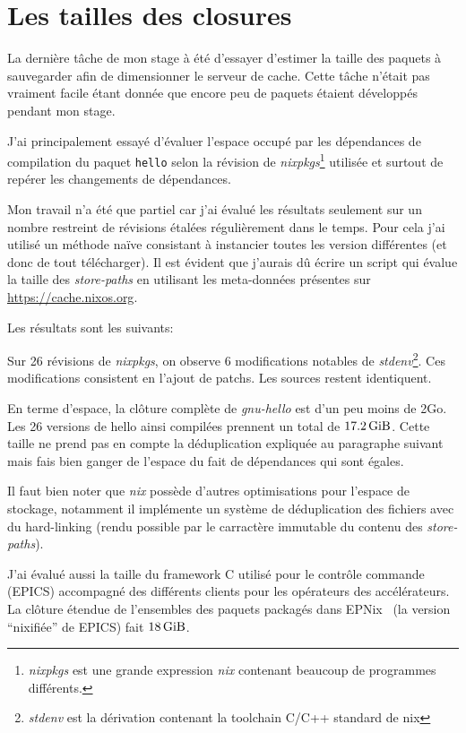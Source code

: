 \documentclass[a4paper,12pt]{article}
\begin{document}
\section{Les tailles des closures}

La dernière tâche de mon stage à été d'essayer d'estimer la taille des paquets à
sauvegarder afin de dimensionner le serveur de cache. Cette tâche n'était pas
vraiment facile étant donnée que encore peu de paquets étaient développés
pendant mon stage.

J'ai principalement essayé d'évaluer l'espace occupé par les dépendances de
compilation du paquet \texttt{hello} selon la révision de
\emph{nixpkgs}\footnote{\emph{nixpkgs} est une grande expression \emph{nix}
contenant beaucoup de programmes différents.} utilisée
et surtout de repérer les changements de dépendances.

Mon travail n'a été que partiel car j'ai évalué les résultats seulement sur un
nombre restreint de révisions étalées régulièrement dans le temps. Pour cela
j'ai utilisé un méthode naïve consistant à instancier toutes les version
différentes (et donc de tout télécharger). Il est évident que j'aurais dû écrire
un script qui évalue la taille des \emph{store-paths} en utilisant les
meta-données présentes sur \url{https://cache.nixos.org}.

Les résultats sont les suivants:


Sur 26 révisions de \emph{nixpkgs}, on observe 6 modifications notables de
\emph{stdenv}\footnote{\emph{stdenv} est la dérivation contenant la toolchain
C/C++ standard de nix}. Ces modifications consistent en l'ajout de patchs. Les
sources restent identiquent.

En terme d'espace, la clôture complète de \emph{gnu-hello} est d'un peu moins de
2Go. Les 26 versions de hello ainsi compilées prennent un total de
$\SI{17.2}{\gibi\byte}$. Cette taille ne prend pas en compte la déduplication
expliquée au paragraphe suivant mais fais bien ganger de l'espace du fait de
dépendances qui sont égales.

Il faut bien noter que \emph{nix} possède d'autres optimisations pour l'espace
de stockage, notamment il implémente un système de déduplication des fichiers
avec du hard-linking (rendu possible par le carractère immutable du contenu
des \emph{store-paths}).

J'ai évalué aussi la taille du framework C utilisé pour le contrôle commande
(EPICS) accompagné des différents clients pour les opérateurs des accélérateurs.
La clôture étendue de l'ensembles des paquets packagés dans EPNix~\cite{epnix} (la version
``nixifiée'' de EPICS) fait $\SI{18}{\gibi\byte}$.
\end{document}
